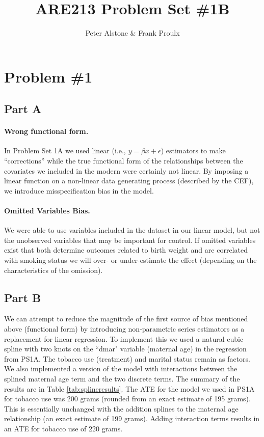 \documentclass[letterpaper, 12pt]{article}
\begin{document}
\title{ARE213 Problem Set \#1B}
\author{Peter Alstone \& Frank Proulx}
\maketitle

\section{Problem \#1}
\subsection{Part A}

\paragraph{Wrong functional form.}
In Problem Set 1A we used linear (i.e., $ y = \beta x + \epsilon$) estimators to make ``corrections'' while the true functional form of the relationships between the covariates we included in the modern were certainly not linear.  By imposing a linear function on a non-linear data generating process (described by the CEF), we introduce misspecification bias in the model.  

\paragraph{Omitted Variables Bias.}  We were able to use variables included in the dataset in our linear model, but not the unobserved variables that may be important for control.  If omitted variables exist that both determine outcomes related to birth weight and are correlated with smoking status we will over- or under-estimate the effect (depending on the characteristics of the omission).   


\subsection{Part B}

We can attempt to reduce the magnitude of the first source of bias mentioned above (functional form) by introducing non-parametric series estimators as a replacement for linear regression.  To implement this we used a natural cubic spline with two knots on the ``dmar" variable (maternal age) in the regression from PS1A.  The tobacco use (treatment) and marital status remain as factors.  We also implemented a version of the model with interactions between the splined maternal age term and the two discrete terms.  The summary of the results are in Table \ref{tab:splineresults}.  The ATE for the model we used in PS1A for tobacco use was 200 grams (rounded from an exact estimate of 195 grams).  This is essentially unchanged with the addition splines to the maternal age relationship (an exact estimate of 199 grams).  Adding interaction terms results in an ATE for tobacco use of 220 grams.  
\end{document}
